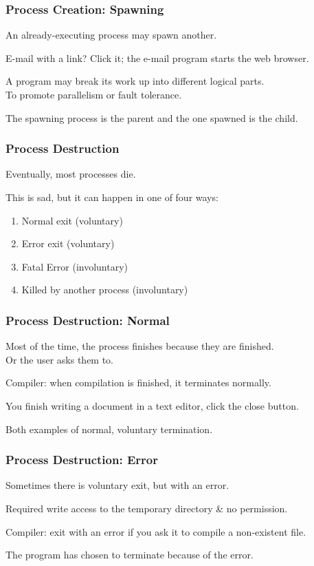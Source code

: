 \begin{frame}
	\frametitle{Process Creation: Spawning}

	An already-executing process may spawn another.

	E-mail with a link? Click it; the e-mail program starts the web browser.

	A program may break its work up into different logical parts.\\
	\quad To promote parallelism or fault tolerance.

	The spawning process is the \alert{parent} and the one spawned is the \alert{child}.


\end{frame}

\begin{frame}
	\frametitle{Process Destruction}

	Eventually, most processes die.

	This is sad, but it can happen in one of four ways:
	\begin{enumerate}
		\item Normal exit (voluntary)
		\item Error exit (voluntary)
		\item Fatal Error (involuntary)
		\item Killed by another process (involuntary)
	\end{enumerate}


\end{frame}

\begin{frame}
	\frametitle{Process Destruction: Normal}

	Most of the time, the process finishes because they are finished.\\
	\quad Or the user asks them to.

	Compiler: when compilation is finished, it terminates normally.

	You finish writing a document in a text editor, click the close button.

	Both examples of normal, voluntary termination.

\end{frame}

\begin{frame}
	\frametitle{Process Destruction: Error}

	Sometimes there is voluntary exit, but with an error.

	Required write access to the temporary directory \& no permission.

	Compiler: exit with an error if you ask it to compile a non-existent file.

	The program has chosen to terminate because of the error.

\end{frame}

